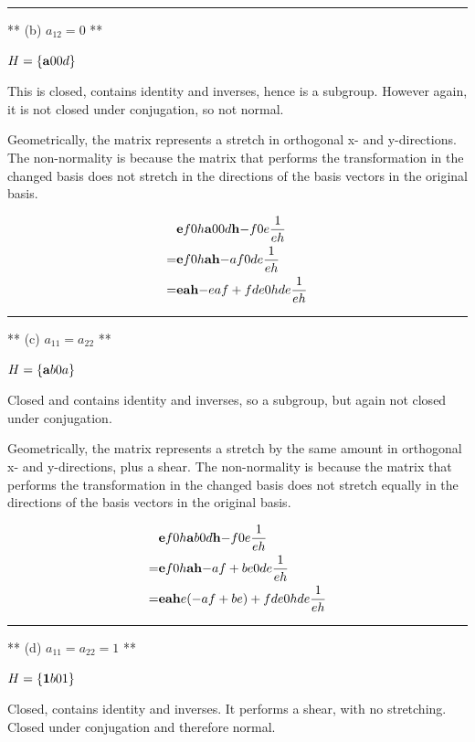 \hrule
** (b) $a_{12} = 0$ **

$H = \left\{ \mathbf{a}{0}
                 {0}{d} \right\}$

This is closed, contains identity and inverses, hence is a subgroup. However
again, it is not closed under conjugation, so not normal.

Geometrically, the matrix represents a stretch in orthogonal x- and
y-directions. The non-normality is because the matrix that performs the
transformation in the changed basis does not stretch in the directions of the
basis vectors in the original basis.

\begin{align*}
&\mathbf{e}{f}
     {0}{h} \mathbf{a}{0}
                {0}{d} \mathbf{h}{-f}
                           {0}{e } \frac{1}{eh} \\
= &\mathbf{e}{f}
       {0}{h} \mathbf{ah}{-af}
                  {0 }{de } \frac{1}{eh} \\
= &\mathbf{eah}{-eaf + fde}
       {0  }{hde       } \frac{1}{eh}
\end{align*}

\hrule
** (c) $a_{11} = a_{22}$ **

$H = \left\{ \mathbf{a}{b}
                 {0}{a} \right\}$

Closed and contains identity and inverses, so a subgroup, but again not closed
under conjugation.

Geometrically, the matrix represents a stretch by the same amount in orthogonal
x- and y-directions, plus a shear. The non-normality is because the matrix that
performs the transformation in the changed basis does not stretch equally in
the directions of the basis vectors in the original basis.

\begin{align*}
&\mathbf{e}{f}
     {0}{h} \mathbf{a}{b}
                {0}{d} \mathbf{h}{-f}
                           {0}{e } \frac{1}{eh} \\
= &\mathbf{e}{f}
       {0}{h} \mathbf{ah}{-af + be}
                  {0 }{de      } \frac{1}{eh} \\
= &\mathbf{eah}{e(-af + be) + fde}
       {0  }{hde              } \frac{1}{eh}
\end{align*}


\hrule
** (d) $a_{11} = a_{22} = 1$ **

$H = \left\{ \mathbf{1}{b}
                 {0}{1} \right\}$

Closed, contains identity and inverses. It performs a shear, with no
stretching. Closed under conjugation and therefore normal.


